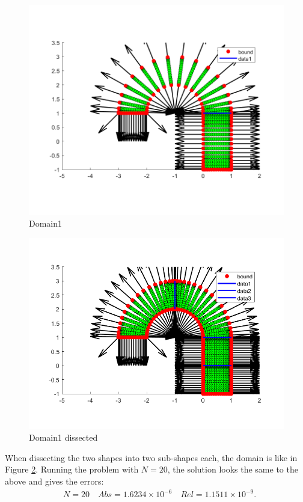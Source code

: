 \documentclass[11pt, a4paper]{article}
\theoremstyle{definition}
\begin{document}
	\begin{figure}[h]
		\centering
		\includegraphics[scale=0.5]{D1.png}
		\caption{Domain1} 
		\label{FD1}
	\end{figure}
	\begin{figure}[h]
		\centering
		\includegraphics[scale=0.5]{D1a.png}
		\caption{Domain1 dissected} 
		\label{FD1a}
	\end{figure}
   When dissecting the two shapes into two sub-shapes each, the domain is like in Figure \ref{FD1a}.
   Running the problem with $N = 20$, the solution looks the same to the above and gives the errors:
   \begin{align*}
   	&N = 20 \quad Abs = 1.6234\times 10^{-6} \quad Rel = 1.1511 \times 10^{-9}.\\
   \end{align*}
\end{document}
